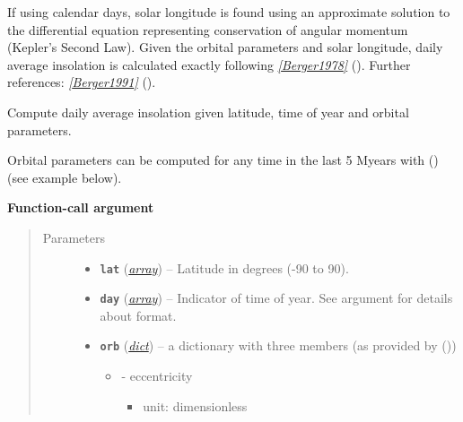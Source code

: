 \documentclass[a4paper,10pt,english]{sphinxmanual}
\begin{document}
If using calendar days, solar longitude is found using an
approximate solution to the differential equation representing conservation
of angular momentum (Kepler's Second Law).  Given the orbital parameters
and solar longitude, daily average insolation is calculated exactly
following \label{api/climlab.solar:id1}{\hyperref[references:berger1978]{\emph{{[}Berger1978{]}}}} (). Further references: \label{api/climlab.solar:id2}{\hyperref[references:berger1991]{\emph{{[}Berger1991{]}}}} ().

\begin{fulllineitems}
\label{api/climlab.solar:climlab.solar.insolation.daily_insolation}
Compute daily average insolation given latitude, time of year and orbital parameters.

Orbital parameters can be computed for any time in the last 5 Myears with
{\hyperref[api/climlab.solar:climlab.solar.orbital.OrbitalTable.lookup_parameters]{\emph{}}} () (see example below).

\textbf{Function-call argument}
\begin{quote}\begin{description}
\item[{Parameters}] \leavevmode\begin{itemize}
\item {} 
\textbf{\texttt{lat}} (\href{http://docs.python.org/2.7/library/array.html\#module-array}{\emph{array}}) -- Latitude in degrees (-90 to 90).

\item {} 
\textbf{\texttt{day}} (\href{http://docs.python.org/2.7/library/array.html\#module-array}{\emph{array}}) -- Indicator of time of year. See argument 
for details about format.

\item {} 
\textbf{\texttt{orb}} (\href{http://docs.python.org/2.7/library/stdtypes.html\#dict}{\emph{dict}}) -- 
a dictionary with three members (as provided by 
{\hyperref[api/climlab.solar:climlab.solar.orbital.OrbitalTable]{\emph{}}} ())
\begin{itemize}
\item {} 
 - eccentricity
\begin{itemize}
\item {} 
unit: dimensionless


\end{itemize}
\end{itemize}
\end{itemize}
\end{description}
\end{quote}
\end{fulllineitems}
\end{document}
